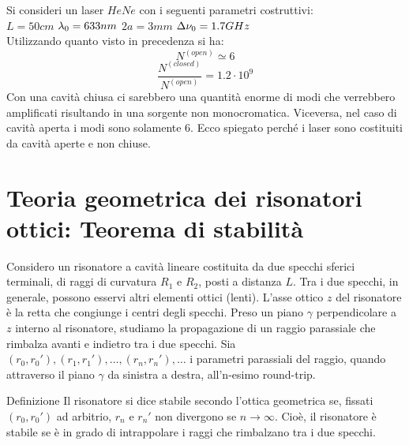 \begin{example}
\begin{exercise}
Si consideri un laser $HeNe$ con i seguenti parametri costruttivi:\\
$L = 50 cm$ $\lambda_0 = 633 nm$ $2a = 3 mm$ $\Delta\nu_0 = 1.7GHz$\\
Utilizzando quanto visto in precedenza si ha:
\begin{equation*}
N^{(open)} \simeq 6
\end{equation*}
\begin{equation*}
\frac{N^{(closed)}}{N^{(open)}} = 1.2 \cdot 10^9
\end{equation*}
Con una cavità chiusa ci sarebbero una quantità enorme di modi che verrebbero amplificati risultando in una sorgente non monocromatica. Viceversa, nel caso di cavità aperta i modi sono solamente 6. Ecco spiegato perché i laser sono costituiti da cavità aperte e non chiuse.
\end{exercise}
\end{example}

\section{Teoria geometrica dei risonatori ottici: Teorema di stabilità}
Considero un risonatore a cavità lineare costituita da due specchi sferici terminali, di raggi di curvatura $R_1$ e $R_2$, posti a distanza $L$. Tra i due specchi, in generale, possono esservi altri elementi ottici (lenti). L'asse ottico $z$ del risonatore è la retta che congiunge i centri degli specchi.
Preso un piano $\gamma$ perpendicolare a $z$ interno al risonatore, studiamo la propagazione di un raggio parassiale che rimbalza avanti e indietro tra i due specchi.
Sia $(r_0,r_0'), (r_1,r_1'), \dots, (r_n,r_n'), \dots$ i parametri parassiali del raggio, quando attraverso il piano $\gamma$ da sinistra a destra, all'n-esimo round-trip.

Definizione
Il risonatore si dice stabile secondo l'ottica geometrica se, fissati $(r_0,r_0')$ ad arbitrio, $r_n$ e $r_n'$ non divergono se $n\rightarrow\infty$. Cioè, il risonatore è stabile se è in grado di intrappolare i raggi che rimbalzano tra i due specchi.

